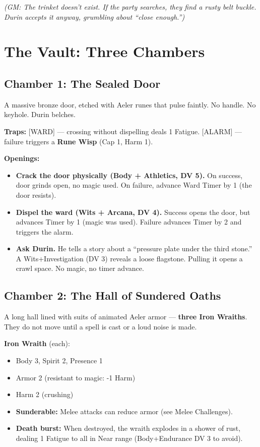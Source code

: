 \documentclass[11pt, a4paper]{article}
\begin{document}
\textit{(GM: The trinket doesn't exist. If the party searches, they find a rusty belt buckle. Durin accepts it anyway, grumbling about ``close enough.'')}

\section{The Vault: Three Chambers}

\subsection{Chamber 1: The Sealed Door}

A massive bronze door, etched with Aeler runes that pulse faintly. No handle. No keyhole. Durin belches.

\textbf{Traps:} [WARD] --- crossing without dispelling deals 1 Fatigue. [ALARM] --- failure triggers a \textbf{Rune Wisp} (Cap 1, Harm 1).

\textbf{Openings:}
\begin{itemize}
\item \textbf{Crack the door physically (Body + Athletics, DV 5).} On success, door grinds open, no magic used. On failure, advance Ward Timer by 1 (the door resists).
\item \textbf{Dispel the ward (Wits + Arcana, DV 4).} Success opens the door, but advances Timer by 1 (magic was used). Failure advances Timer by 2 and triggers the alarm.
\item \textbf{Ask Durin.} He tells a story about a ``pressure plate under the third stone.'' A Wits+Investigation (DV 3) reveals a loose flagstone. Pulling it opens a crawl space. No magic, no timer advance.
\end{itemize}

\subsection{Chamber 2: The Hall of Sundered Oaths}

A long hall lined with suits of animated Aeler armor --- \textbf{three Iron Wraiths}. They do not move until a spell is cast or a loud noise is made.

\textbf{Iron Wraith} (each):
\begin{itemize}
\item Body 3, Spirit 2, Presence 1
\item Armor 2 (resistant to magic: -1 Harm)
\item Harm 2 (crushing)
\item \textbf{Sunderable:} Melee attacks can reduce armor (see Melee Challenges).
\item \textbf{Death burst:} When destroyed, the wraith explodes in a shower of rust, dealing 1 Fatigue to all in Near range (Body+Endurance DV 3 to avoid).
\end{itemize}
\end{document}

